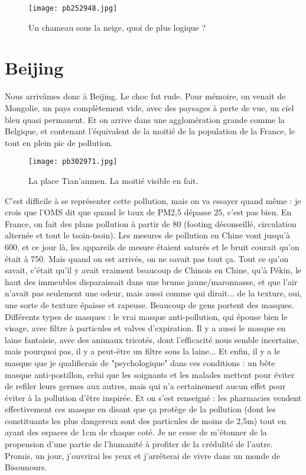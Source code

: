 \documentclass{book}
\begin{document}
\begin{figure}[h]
\centering
\texttt{[image: pb252948.jpg]}
\caption*{ Un chameau sous la neige, quoi de plus logique ?}
\end{figure}



\chapter{Beijing}
Nous arrivâmes donc à Beijing. Le choc fut rude. Pour mémoire, on venait de Mongolie, un pays complètement vide, avec des paysages à perte de vue, un ciel bleu quasi permanent. Et on arrive dans une agglomération grande comme la Belgique, et contenant l'équivalent de la moitié de la population de la France, le tout en plein pic de pollution.


\begin{figure}[H]
\centering
\texttt{[image: pb302971.jpg]}
\caption*{ La place Tian'anmen. La moitié visible en fait.}
\end{figure}

C'est difficile à se représenter cette pollution, mais on va essayer quand même : je crois que l'OMS dit que quand le taux de PM2,5 dépasse 25, c'est pas bien. En France, on fait des plans pollution à partir de 80 (footing déconseillé, circulation alternée et tout le tsoin-tsoin). Les mesures de pollution en Chine vont jusqu'à 600, et ce jour là, les appareils de mesure étaient saturés et le bruit courait qu'on était à 750. Mais quand on est arrivés, on ne savait pas tout ça. Tout ce qu'on savait, c'était qu'il y avait vraiment beaucoup de Chinois en Chine, qu'à Pékin, le haut des immeubles disparaissait dans une brume jaune/maronnasse, et que l'air n'avait pas seulement une odeur, mais aussi comme qui dirait... de la texture, oui, une sorte de texture épaisse et rapeuse. Beaucoup de gens portent des masques. Différents types de masques : le vrai masque anti-pollution, qui épouse bien le visage, avec filtre à particules et valves d'expiration. Il y a aussi le masque en laine fantaisie, avec des animaux tricotés, dont l'efficacité nous semble incertaine, mais pourquoi pas, il y a peut-être un filtre sous la laine... Et enfin, il y a le masque que je qualifierais de "psychologique" dans ces conditions : un bête masque anti-postillon, celui que les soignants et les malades mettent pour éviter de refiler leurs germes aux autres, mais qui n'a certainement aucun effet pour éviter à la pollution d'être inspirée. Et on s'est renseigné : les pharmacies vendent effectivement ces masque en disant que ça protège de la pollution (dont les constituants les plus dangereux sont des particules de moins de 2,5\textmu{}m) tout en ayant des espaces de 1cm de chaque coté. Je ne cesse de m'étonner de la propension d'une partie de l'humanité à profiter de la crédulité de l'autre. Promis, un jour, j'ouvrirai les yeux et j'arrêterai de vivre dans un monde de Bisounours.
\end{document}
